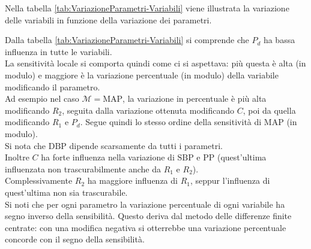 

Nella tabella \ref{tab:VariazioneParametri-Variabili} viene illustrata la variazione delle variabili in funzione della variazione dei parametri.

\newpage



\newpage
Dalla tabella \ref{tab:VariazioneParametri-Variabili} si comprende che $P_d$ ha bassa influenza in tutte le variabili.\\
La sensitività locale si comporta quindi come ci si aspettava: più questa è alta (in modulo) e maggiore è la variazione percentuale (in modulo) della variabile modificando il parametro.\\
Ad esempio nel caso $\mathcal{M}=\text{MAP}$, la variazione in percentuale è più alta modificando $R_2$, seguita dalla variazione ottenuta modificando $C$, poi da quella modificando $R_1$ e $P_d$. Segue quindi lo stesso ordine della sensitività di $\text{MAP}$ (in modulo).\\
Si nota che $\text{DBP}$ dipende scarsamente da tutti i parametri.\\
Inoltre $C$ ha forte influenza nella variazione di $\text{SBP}$ e $\text{PP}$ (quest'ultima influenzata non trascurabilmente anche da $R_1$ e $R_2$).\\
Complessivamente $R_2$ ha maggiore influenza di $R_1$, seppur l'influenza di quest'ultima non sia trascurabile.\\

Si noti che per ogni parametro la variazione percentuale di ogni variabile ha segno inverso della sensibilità. Questo deriva dal metodo delle differenze finite centrate: con una modifica negativa si otterrebbe una variazione percentuale concorde con il segno della sensibilità.